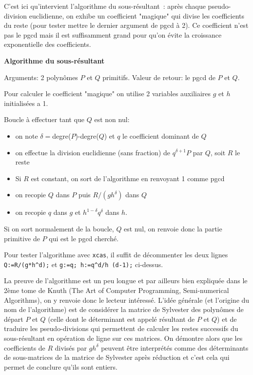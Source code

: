 \documentclass[a4paper,11pt]{article}
\begin{document}
\begin{giacjshere}
C'est ici qu'intervient l'algorithme du sous-résultant~: après chaque
pseudo-division euclidienne, on exhibe un coefficient "magique" qui divise les
coefficients du reste (pour tester mettre le dernier argument de pgcd
\`a 2). 
Ce coefficient n'est pas le pgcd mais il est
suffisamment grand pour qu'on évite la croissance exponentielle des
coefficients.



{\bf{Algorithme du sous-résultant}}

Arguments: 2 polynômes $P$ et $Q$ primitifs. Valeur de retour: le pgcd de $P$
et $Q$.

Pour calculer le coefficient "magique" on utilise 2 variables auxiliaires $g$
et $h$ initialisées a 1.

Boucle à effectuer tant que $Q$ est non nul:
\begin{itemize}
  \item on note $\delta =$degre($P$)-degre($Q$) et $q$ le coefficient dominant
  de $Q$
  
  \item on effectue la division euclidienne (sans fraction) de $q^{\delta + 1}
  P$ par $Q$, soit $R$ le reste
  
  \item Si $R$ est constant, on sort de l'algorithme en renvoyant 1 comme pgcd
  
  \item on recopie $Q$ dans $P$ puis $R / ( g h^{\delta} )$ dans $Q$
  
  \item on recopie $q$ dans $g$ et $h^{1 - \delta} q^{\delta}$ dans $h$.
\end{itemize}
Si on sort normalement de la boucle, $Q$ est nul, on renvoie donc la partie
primitive de $P$ qui est le pgcd cherché.

Pour tester l'algorithme avec {\tt{xcas}}, il suffit de décommenter les
deux lignes {\tt{Q:=R/(g*h\^{ }d);}} et {\tt{g:=q; h:=q\^{ }d/h\^{
}(d-1);}} ci-dessus.

La preuve de l'algorithme est un peu longue et par ailleurs bien expliqu\'ee
dans le 2ème tome de Knuth (The Art of Computer Programming, Semi-numerical
Algorithms), on y renvoie donc le lecteur intéressé. L'idée générale
(et l'origine du nom de l'algorithme) 
est de considérer la matrice de Sylvester des polynômes de
départ $P$ et $Q$ (celle dont le déterminant est appelé résultant de $P$ et
$Q$) et de traduire les pseudo-divisions qui permettent de calculer les restes
successifs du sous-résultant en opération de ligne sur ces matrices. On
démontre alors que les coefficients de $R$ divisés par $g h^{\delta}$ peuvent
être interprétés comme des déterminants de sous-matrices de la matrice de
Sylvester après réduction et c'est cela qui permet de conclure qu'ils sont
entiers.


\end{giacjshere}
\end{document}
